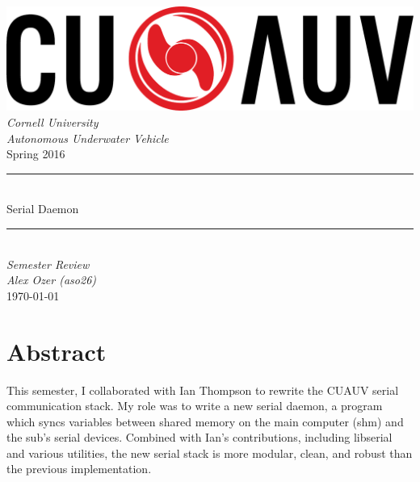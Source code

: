 \documentclass[11pt]{article}
\let\oldsection\section
\renewcommand\section{\clearpage\oldsection}
\begin{document}
\begin{titlepage}
\begin{center}
\includegraphics[width=\textwidth]{images/new_cuauv_logo2.pdf}\\[0.2cm]
\textsl{\huge Cornell University} \\[0.05cm]
\textsl{\huge Autonomous Underwater Vehicle}\\[0.5cm]
{\huge Spring 2016}\\[0.2cm]
\rule{\linewidth}{0.5mm}\\[0.2cm]
{\Huge Serial Daemon}
\rule{\linewidth}{0.5mm}\\[0.4cm]

\emph{\huge Semester Review}\\[0.5cm]
\textsl{\large Alex Ozer (aso26)}\\[0.05cm]
\vfill{\today}
\end{center}
\end{titlepage}

\pdfpagewidth 8.5in
\pdfpageheight 11in

\pagestyle{fancy}
\fancyhf{}
\setlength{\headheight}{30pt}
\renewcommand{\headrulewidth}{0.4pt}
\renewcommand{\footrulewidth}{0.4pt}

\cfoot{\thepage}

\tableofcontents

\section{Abstract}
This semester, I collaborated with Ian Thompson to rewrite the CUAUV serial communication stack. My role was to write a new serial daemon, a program which syncs variables between shared memory on the main computer (shm) and the sub's serial devices. Combined with Ian's contributions, including libserial and various utilities, the new serial stack is more modular, clean, and robust than the previous implementation.
\end{document}
